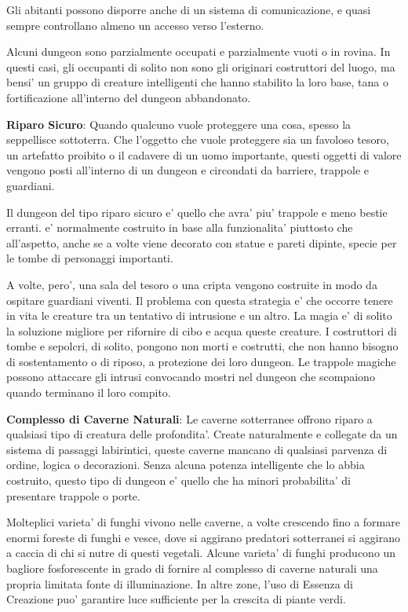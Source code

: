 \documentclass[a4paper,11pt,twoside,openany]{dndbook}
\begin{document}
{Gli abitanti possono disporre anche di un sistema di comunicazione, e quasi sempre
controllano almeno un accesso verso l'esterno.

Alcuni dungeon sono parzialmente occupati e parzialmente vuoti o in rovina. In questi casi, gli occupanti di solito non sono gli originari costruttori del luogo, ma bensi' un gruppo di creature intelligenti che hanno stabilito la loro base, tana o fortificazione all'interno del dungeon abbandonato.

\textbf{Riparo Sicuro}: Quando qualcuno vuole proteggere una cosa, spesso la seppellisce sottoterra. Che l'oggetto che vuole proteggere sia un favoloso tesoro, un artefatto proibito o il cadavere di un uomo importante, questi oggetti di valore vengono posti all'interno di un dungeon e circondati da barriere, trappole e guardiani.

Il dungeon del tipo riparo sicuro e' quello che avra' piu' trappole e meno bestie erranti. e' normalmente costruito in base alla funzionalita' piuttosto che all'aspetto, anche se a volte viene decorato con statue e pareti dipinte, specie per le tombe di personaggi importanti.

A volte, pero', una sala del tesoro o una cripta vengono costruite in modo da ospitare guardiani viventi. Il problema con questa strategia e' che occorre tenere in vita le creature tra un tentativo di intrusione e un altro. La magia e' di solito la soluzione migliore per rifornire di cibo e acqua queste creature. I costruttori di tombe e sepolcri, di solito, pongono non morti e costrutti, che non hanno bisogno di sostentamento o di riposo, a protezione dei loro dungeon. Le trappole magiche possono attaccare gli intrusi convocando mostri nel dungeon che scompaiono quando terminano il loro compito.

\textbf{Complesso di Caverne Naturali}: Le caverne sotterranee offrono riparo a qualsiasi tipo di creatura delle profondita'. Create naturalmente e collegate da un sistema di passaggi labirintici, queste caverne mancano di qualsiasi parvenza di ordine, logica o decorazioni. Senza alcuna potenza intelligente che lo abbia costruito, questo tipo di dungeon e' quello che ha minori probabilita' di presentare trappole o porte.

Molteplici varieta' di funghi vivono nelle caverne, a volte crescendo fino a formare enormi foreste di funghi e vesce, dove si aggirano predatori sotterranei si aggirano a caccia di chi si nutre di questi vegetali. Alcune varieta' di funghi producono un bagliore fosforescente in grado di fornire al complesso di caverne naturali una propria limitata fonte di illuminazione. In altre zone, l'uso di Essenza di Creazione puo' garantire luce sufficiente per la crescita di piante verdi.

}
\end{document}

